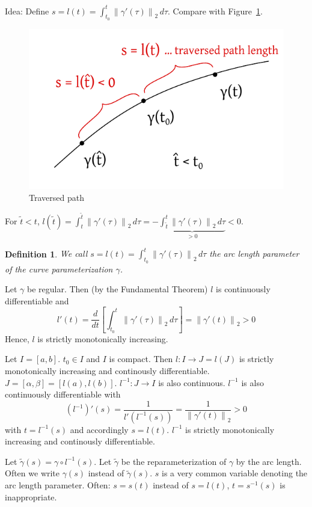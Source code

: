 \documentclass{article}
\newtheorem{definition}{Definition}  \numberwithin{definition}{section}
\newcommand{\norm}[1]{\left\|#1\right\|}
\begin{document}
Idea: Define $s = l(t) = \int_{t_0}^t \norm{\gamma'(\tau)}_2 \, d\tau$. Compare with Figure~\ref{img:traversedpath}.

\begin{figure}[t]
  \begin{center}
    \includegraphics[width=.6\textwidth]{img/47_traversed_path.pdf}
    \caption{Traversed path}
    \label{img:traversedpath}
  \end{center}
\end{figure}

For $\tilde t < t$, $l(\tilde t) = \int_{t}^{\tilde t} \norm{\gamma'(\tau)}_2 \, d\tau = -\underbrace{\int_{\tilde t}^{t} \norm{\gamma'(\tau)}_2 \, d\tau}_{> 0} < 0$.

\begin{definition}
  We call $s = l(t) = \int_{t_0}^t \norm{\gamma'(\tau)}_2 \, d\tau$ the arc length parameter of the curve parameterization $\gamma$.
\end{definition}

Let $\gamma$ be regular. Then (by the Fundamental Theorem) $l$ is continuously differentiable and
\[ l'(t) = \frac{d}{dt} \left[\int_{t_0}^t \norm{\gamma'(\tau)}_2 \, d\tau\right] = \norm{\gamma'(t)}_2 > 0 \]
Hence, $l$ is strictly monotonically increasing.

Let $I = [a,b]$. $t_0 \in I$ and $I$ is compact. Then $l: I \to J = l(J)$ is strictly monotonically increasing and continously differentiable. $J = [\alpha, \beta] = [l(a), l(b)]$. $l^{-1}: J \to I$ is also continuous. $l^{-1}$ is also continuously differentiable with
\[ (l^{-1})'(s) = \frac{1}{l'(l^{-1}(s))} = \frac{1}{\norm{\gamma'(t)}_2} > 0 \]
with $t = l^{-1}(s)$ and accordingly $s = l(t)$. $l^{-1}$ is strictly monotonically increasing and continously differentiable.

Let $\tilde\gamma(s) = \gamma \circ l^{-1}(s)$. Let $\tilde\gamma$ be the reparameterization of $\gamma$ by the arc length. Often we write $\gamma(s)$ instead of $\tilde\gamma(s)$. $s$ is a very common variable denoting the arc length parameter.
Often: $s = s(t)$ instead of $s = l(t)$, $t = s^{-1}(s)$ is inappropriate.
\end{document}
